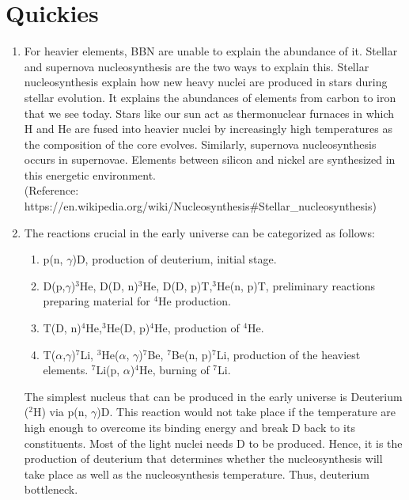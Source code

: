 \section{Quickies}
\begin{enumerate}[label=\alph*)]
\item For heavier elements, BBN are unable to explain the abundance of it. Stellar and supernova nucleosynthesis are the two ways to explain this. Stellar nucleosynthesis explain how new heavy nuclei are produced in stars during stellar evolution. It explains the abundances of elements from carbon to iron that we see today. Stars like our sun act as thermonuclear furnaces in which H and He are fused into heavier nuclei by increasingly high temperatures as the composition of the core evolves. Similarly, supernova nucleosynthesis occurs in supernovae. Elements between silicon and nickel are synthesized in this energetic environment. \\
(Reference: https://en.wikipedia.org/wiki/Nucleosynthesis\#Stellar\_nucleosynthesis)

\item The reactions crucial in the early universe can be categorized as follows:
\begin{enumerate}[label=\roman*)]
\item p(n, $\gamma$)D, production of deuterium, initial stage.
\item D(p,$\gamma$)$^3$He, D(D, n)$^3$He, D(D, p)T,$ ^3$He(n, p)T, preliminary reactions preparing material for $^4$He production.
\item T(D, n)$^4$He,$ ^3$He(D, p)$^4$He, production of $^4$He.
\item T($\alpha$,$ \gamma$)$^7$Li, $^3$He($\alpha$, $\gamma$)$^7$Be, $^7$Be(n, p)$^7$Li, production of the heaviest elements. $^7$Li(p, $\alpha$)$^4$He, burning of $^7$Li.
\end{enumerate}

The simplest nucleus that can be produced in the early universe is Deuterium ($^2$H) via p(n, $\gamma$)D. This reaction would not take place if the temperature are high enough to overcome its binding energy and break D back to its constituents. Most of the light nuclei needs D to be produced. Hence, it is the production of deuterium that determines whether the nucleosynthesis will take place as well as the nucleosynthesis temperature. Thus, deuterium bottleneck.


\end{enumerate}